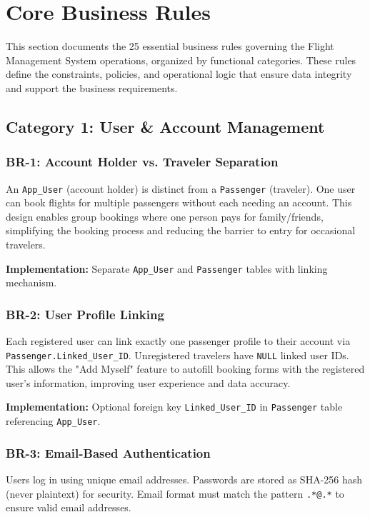 \documentclass[12pt,a4paper,openany]{report}
\begin{document}
\section{Core Business Rules}

This section documents the 25 essential business rules governing the Flight Management System operations, organized by functional categories. These rules define the constraints, policies, and operational logic that ensure data integrity and support the business requirements.

\subsection{Category 1: User \& Account Management}

\subsubsection{BR-1: Account Holder vs. Traveler Separation}
An \texttt{App\_User} (account holder) is distinct from a \texttt{Passenger} (traveler). One user can book flights for multiple passengers without each needing an account. This design enables group bookings where one person pays for family/friends, simplifying the booking process and reducing the barrier to entry for occasional travelers.

\textbf{Implementation:} Separate \texttt{App\_User} and \texttt{Passenger} tables with linking mechanism.

\subsubsection{BR-2: User Profile Linking}
Each registered user can link exactly one passenger profile to their account via \texttt{Passenger.Linked\_User\_ID}. Unregistered travelers have \texttt{NULL} linked user IDs. This allows the "Add Myself" feature to autofill booking forms with the registered user's information, improving user experience and data accuracy.

\textbf{Implementation:} Optional foreign key \texttt{Linked\_User\_ID} in \texttt{Passenger} table referencing \texttt{App\_User}.

\subsubsection{BR-3: Email-Based Authentication}
Users log in using unique email addresses. Passwords are stored as SHA-256 hash (never plaintext) for security. Email format must match the pattern \texttt{.*@.*} to ensure valid email addresses.
\end{document}
